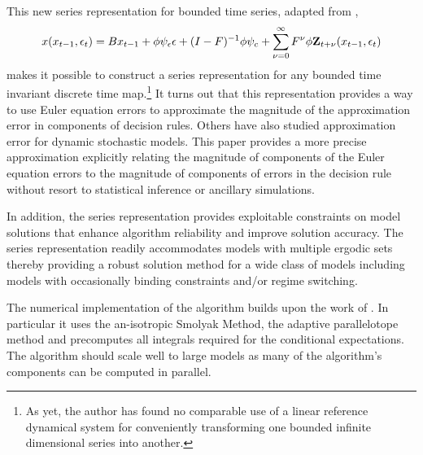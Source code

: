 \documentclass[12pt]{article}
\begin{document}
This new series representation for bounded time series, adapted from \citep{anderson10},
\begin{gather*}
      	 x\tArg =B x_{t-1}+ \phi \psi_\epsilon\epsilon + (I - F)^{-1} \phi \psi_c + \sum_{\sForSum=0}^\infty F^\sForSum \phi \ZWOarg_{t+\nu}\tArg%
    \end{gather*}
 makes it possible to  construct a series
    representation for any bounded time invariant discrete time map.\footnote{As yet, the author has found no comparable use of a
linear reference dynamical system for  conveniently transforming
one bounded infinite dimensional series into another.
}
    It turns out that this representation provides a way to use
    Euler equation errors to
    approximate the magnitude of the    approximation error in components of 
    decision rules.
    Others have also studied approximation error for dynamic stochastic models\cite{judd2017lower,santos2005accuracy,Santos2000accuracy}. This paper provides a more precise approximation
    explicitly relating the magnitude of components of the
    Euler equation errors to the magnitude of components of
    errors in the decision rule 
without resort to statistical inference or ancillary simulations.

    In addition, the series representation provides exploitable
    constraints on model solutions that enhance  
    algorithm reliability and improve solution accuracy.
    The series representation readily accommodates models with
    multiple ergodic sets
    thereby providing a robust solution method for a wide class of models including models with occasionally binding constraints and/or regime switching.


The numerical implementation of the algorithm 
builds upon the work of
\citep{juddGSSA2011}.
In particular it uses
the an-isotropic Smolyak Method, the adaptive
parallelotope method\citep{Judd2014}
and precomputes all integrals required for the conditional expectations.
The algorithm should scale well to large models as many 
of the algorithm's components can be computed in parallel.
\end{document}
